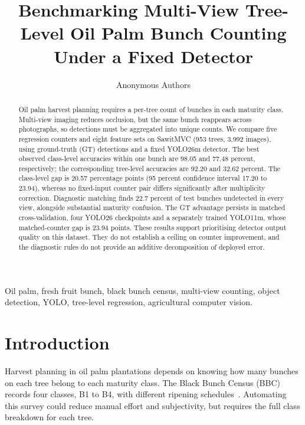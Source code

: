 \documentclass[conference,a4paper]{IEEEtran}
\begin{document}
\title{Benchmarking Multi-View Tree-Level Oil Palm Bunch Counting Under a Fixed Detector}

\author{Anonymous Authors}

\maketitle

\begin{abstract}
Oil palm harvest planning requires a per-tree count of bunches in each maturity
class. Multi-view imaging reduces occlusion, but the same bunch reappears across
photographs, so detections must be aggregated into unique counts. We compare
five regression counters and eight feature sets on SawitMVC (953 trees, 3,992
images), using ground-truth (GT) detections and a fixed YOLO26m detector. The
best observed class-level accuracies within one bunch are 98.05 and 77.48
percent, respectively; the corresponding tree-level accuracies are 92.20 and
32.62 percent. The class-level gap is 20.57 percentage points (95 percent
confidence interval 17.20 to 23.94), whereas no fixed-input counter pair
differs significantly after multiplicity correction. Diagnostic matching finds
22.7 percent of test bunches undetected in every view, alongside substantial maturity
confusion. The GT advantage persists in matched cross-validation, four YOLO26
checkpoints and a separately trained YOLO11m, whose matched-counter gap is
23.94 points. These results support prioritising detector output quality on
this dataset. They do not establish a ceiling on counter improvement, and
the diagnostic rules do not provide an additive decomposition of deployed error.

\end{abstract}
\begin{IEEEkeywords}
Oil palm, fresh fruit bunch, black bunch census, multi-view counting, object
detection, YOLO, tree-level regression, agricultural computer vision.
\end{IEEEkeywords}

\section{Introduction}
Harvest planning in oil palm plantations depends on knowing how many bunches
on each tree belong to each maturity class. The Black Bunch Census (BBC)
records four classes, B1 to B4, with different ripening schedules~\cite{ref12}. Automating this survey could reduce manual effort
and subjectivity, but requires the full class breakdown for each tree.
\end{document}

